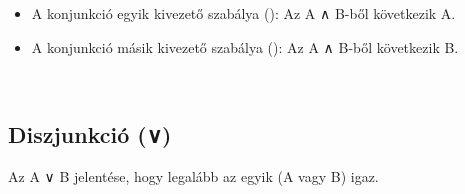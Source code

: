 \begin{itemize}
\begin{code}
\AgdaSpace{}%
\AgdaSpace{}%
\AgdaSymbol{(}\AgdaSpace{}%
\AgdaSpace{}%
\AgdaSymbol{)}\<%
\end{code}
\item A konjunkció egyik kivezető szabálya (): Az A ∧ B-ből következik A.
\item A konjunkció másik kivezető szabálya (): Az A ∧ B-ből következik B.
\begin{code}%
%
\>[6]\AgdaSpace{}%
\AgdaSymbol{:}\AgdaSpace{}%
\AgdaSpace{}%
\AgdaSpace{}%
\AgdaSymbol{\}}\AgdaSpace{}%
\AgdaSpace{}%
\AgdaSpace{}%
\AgdaSpace{}%
\AgdaSymbol{(}\AgdaSpace{}%
\AgdaSpace{}%
\AgdaSymbol{)}\AgdaSpace{}%
\AgdaSpace{}%
\AgdaSpace{}%
\AgdaSpace{}%
\<%
\\
%
\>[6]\AgdaSpace{}%
\AgdaSymbol{:}\AgdaSpace{}%
\AgdaSpace{}%
\AgdaSpace{}%
\AgdaSymbol{\}}\AgdaSpace{}%
\AgdaSpace{}%
\AgdaSpace{}%
\AgdaSpace{}%
\AgdaSymbol{(}\AgdaSpace{}%
\AgdaSpace{}%
\AgdaSymbol{)}\AgdaSpace{}%
\AgdaSpace{}%
\AgdaSpace{}%
\AgdaSpace{}%
\<%
\end{code}
\end{itemize}

\subsection{Diszjunkció (∨)}
Az A ∨ B jelentése, hogy legalább az egyik (A vagy B) igaz.
\begin{code}%
%
\>[6]%
\>[12]\AgdaSymbol{:}\AgdaSpace{}%
\AgdaSymbol{\}}\AgdaSpace{}%
\AgdaSpace{}%
\AgdaSpace{}%
\AgdaSpace{}%
\AgdaSpace{}%
\AgdaSpace{}%
\AgdaSpace{}%
\AgdaSpace{}%
\AgdaSpace{}%
\<%
\end{code}

